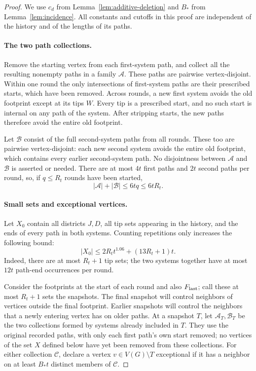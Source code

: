 \begin{proof}
We use \(c_d\) from Lemma~\ref{lem:additive-deletion} and \(B_*\) from
Lemma~\ref{lem:incidence}. All constants and cutoffs in this proof are
independent of the history and of the lengths of its paths.

\paragraph{The two path collections.}
Remove the starting vertex from each first-system path, and collect all
the resulting nonempty paths in a family \(\mathcal A\). These paths
are pairwise vertex-disjoint. Within one round the only intersections
of first-system paths are their prescribed starts, which have been
removed. Across rounds, a new first system avoids the old footprint
except at its tips \(W\). Every tip is a prescribed start, and no such
start is internal on any path of the system. After stripping starts,
the new paths therefore avoid the entire old footprint.

Let \(\mathcal B\) consist of the full second-system paths from all
rounds. These too are pairwise vertex-disjoint: each new second system
avoids the entire old footprint, which contains every earlier
second-system path. No disjointness between \(\mathcal A\) and
\(\mathcal B\) is asserted or needed.
There are at most \(4t\) first paths and \(2t\) second paths per round,
so, if \(q\le R_t\) rounds have been started,
\begin{equation}
 \label{separate:path-count}
 |\mathcal A|+|\mathcal B|\le6tq\le6tR_t.
\end{equation}

\paragraph{Small sets and exceptional vertices.}
Let \(X_0\) contain all districts \(J,D\), all tip sets appearing in
the history, and the ends of every path in both systems. Counting
repetitions only increases the following bound:
\begin{equation}
 \label{separate:x0}
 |X_0|\le 2R_t t^{1.06}+(13R_t+1)t.
\end{equation}
Indeed, there are at most \(R_t+1\) tip sets; the two systems together
have at most \(12t\) path-end occurrences per round.

Consider the footprints at the start of each round and also
\(F_{\rm last}\); call these at most \(R_t+1\) sets the snapshots.
The final snapshot will control neighbors of vertices outside the
final footprint. Earlier snapshots will control the neighbors that a
newly entering vertex has on older paths.
At a snapshot \(T\), let \(\mathcal A_T,\mathcal B_T\) be the two
collections formed by systems already included in \(T\).
They use the original recorded paths, with only each first path's
own start removed; no vertices of the set \(X\) defined below have
yet been removed from these collections.
For either collection \(\mathcal C\), declare a vertex
\(v\in V(G)\setminus T\) exceptional if it has a neighbor on at least
\(B_*t\) distinct members of \(\mathcal C\).


\end{proof}
